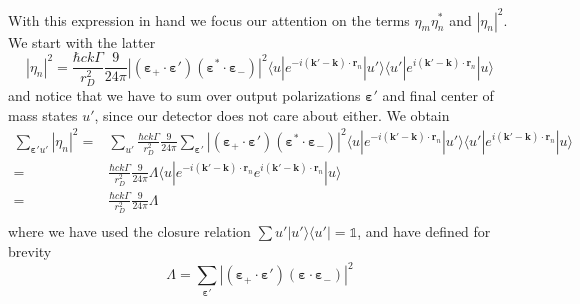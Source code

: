 \documentclass[11pt,letter]{article}
\newcommand{\bv}[1]{\ensuremath{\bm{#1}}}
\begin{document}
With this expression in hand we focus our attention on the terms
$\eta_{m}\eta_{n}^{*}$ and $|\eta_{n}|^{2}$.  We start with the latter 
\begin{equation}
 |\eta_{n}|^{2} =  \frac{\hbar c k \Gamma}{r_{D}^{2}}  
    \frac{9}{24\pi} 
       | (\bv{\varepsilon}_{+}\cdot \bv{\varepsilon}' )
                       (\bv{\varepsilon}^{*}\cdot \bv{\varepsilon}_{-} ) |^{2}
      \langle u | e^{-i(\bv{k}'-\bv{k}) \cdot\bv{r}_{n}} | u'  \rangle
      \langle u' | e^{i(\bv{k}'-\bv{k}) \cdot\bv{r}_{n}} | u  \rangle
\end{equation}
and notice that we have to sum over output polarizations $\bv{\varepsilon}'$
and final center of mass states  $u'$, since our detector does not care about
either. We obtain 
\begin{equation}
\begin{split}
 \sum_{\bv{\varepsilon}' u'}|\eta_{n}|^{2} = & 
    \sum_{ u'} \frac{\hbar c k \Gamma}{r_{D}^{2}}  
    \frac{9}{24\pi} 
      \sum_{\bv{\varepsilon}'} | (\bv{\varepsilon}_{+}\cdot \bv{\varepsilon}' )
                       (\bv{\varepsilon}^{*}\cdot \bv{\varepsilon}_{-} ) |^{2}
      \langle u | e^{-i(\bv{k}'-\bv{k}) \cdot\bv{r}_{n}} | u'  \rangle
      \langle u' | e^{i(\bv{k}'-\bv{k}) \cdot\bv{r}_{n}} | u  \rangle \\
 = & \frac{\hbar c k \Gamma}{r_{D}^{2}}  
    \frac{9}{24\pi} \Lambda 
      \langle u | e^{-i(\bv{k}'-\bv{k}) \cdot\bv{r}_{n}}  e^{i(\bv{k}'-\bv{k}) \cdot\bv{r}_{n}} | u  \rangle \\
 = & \frac{\hbar c k \Gamma}{r_{D}^{2}}  
    \frac{9}{24\pi} \Lambda \\ 
\end{split}
\end{equation}
where we have used the closure relation $\sum{u'}|u'\rangle\langle u'| =
\mathbb{1}$, and have defined for brevity 
\begin{equation}
 \Lambda = 
  \sum_{\bv{\varepsilon}' }
        | (\bv{\varepsilon}_{+}\cdot \bv{\varepsilon}' )
                        (\bv{\varepsilon}\cdot \bv{\varepsilon}_{-} ) |^{2} 
\end{equation} 
\end{document}
